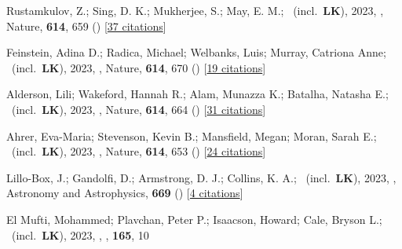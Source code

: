 \item[{\color{numcolor}\scriptsize83}] Rustamkulov, Z.; Sing, D. K.; Mukherjee, S.; May, E. M.; \etal\ (incl.\ \textbf{LK}), 2023, , Nature, \textbf{614}, 659 () [\href{https://ui.adsabs.harvard.edu/abs/2023Natur.614..659R}{37 citations}]

\item[{\color{numcolor}\scriptsize82}] Feinstein, Adina D.; Radica, Michael; Welbanks, Luis; Murray, Catriona Anne; \etal\ (incl.\ \textbf{LK}), 2023, , Nature, \textbf{614}, 670 () [\href{https://ui.adsabs.harvard.edu/abs/2023Natur.614..670F}{19 citations}]

\item[{\color{numcolor}\scriptsize81}] Alderson, Lili; Wakeford, Hannah R.; Alam, Munazza K.; Batalha, Natasha E.; \etal\ (incl.\ \textbf{LK}), 2023, , Nature, \textbf{614}, 664 () [\href{https://ui.adsabs.harvard.edu/abs/2023Natur.614..664A}{31 citations}]

\item[{\color{numcolor}\scriptsize80}] Ahrer, Eva-Maria; Stevenson, Kevin B.; Mansfield, Megan; Moran, Sarah E.; \etal\ (incl.\ \textbf{LK}), 2023, , Nature, \textbf{614}, 653 () [\href{https://ui.adsabs.harvard.edu/abs/2023Natur.614..653A}{24 citations}]

\item[{\color{numcolor}\scriptsize79}] Lillo-Box, J.; Gandolfi, D.; Armstrong, D. J.; Collins, K. A.; \etal\ (incl.\ \textbf{LK}), 2023, , Astronomy and Astrophysics, \textbf{669} () [\href{https://ui.adsabs.harvard.edu/abs/2023A&A...669A.109L}{4 citations}]

\item[{\color{numcolor}\scriptsize78}] El Mufti, Mohammed; Plavchan, Peter P.; Isaacson, Howard; Cale, Bryson L.; \etal\ (incl.\ \textbf{LK}), 2023, , \aj, \textbf{165}, 10

